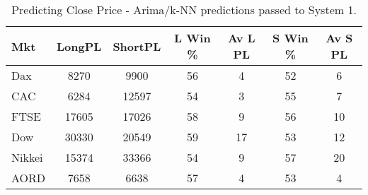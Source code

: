 \begin{table}[ht]
\centering
\caption[Predicting Close Price - Arima/k-NN predictions passed to System 1.]{Predicting Close Price - Arima/k-NN predictions passed to System 1.} 
\label{tab:chp_ts:pred_close_arima_knn_sys1}
\begin{tabular}{lcccccc}
  \toprule Mkt & LongPL & ShortPL & L Win \% & Av L PL & S Win \% & Av S PL \\ 
  \midrule Dax & 8270 & 9900 & 56 & 4 & 52 & 6 \\ 
  CAC & 6284 & 12597 & 54 & 3 & 55 & 7 \\ 
  FTSE & 17605 & 17026 & 58 & 9 & 56 & 10 \\ 
  Dow & 30330 & 20549 & 59 & 17 & 53 & 12 \\ 
  Nikkei & 15374 & 33366 & 54 & 9 & 57 & 20 \\ 
  AORD & 7658 & 6638 & 57 & 4 & 53 & 4 \\ 
   \bottomrule \end{tabular}
\end{table}

